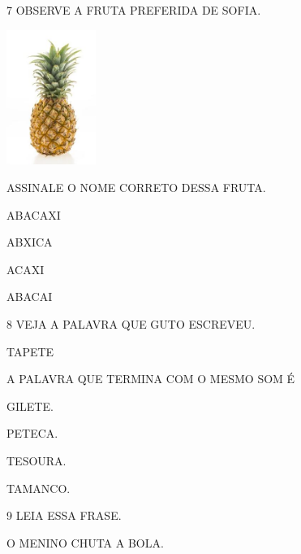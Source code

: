 \num{7} OBSERVE A FRUTA PREFERIDA DE SOFIA.

\includegraphics[width=1.15208in,height=1.72708in]{media/image192.jpg}


ASSINALE O NOME CORRETO DESSA FRUTA.

\begin{escolha}
\item ABACAXI

\item ABXICA

\item ACAXI

\item ABACAI
\end{escolha}

\num{8} VEJA A PALAVRA QUE GUTO ESCREVEU.

\begin{mdframed}[linewidth=2pt,linecolor=azul!20,backgroundcolor=azul!20,roundcorner=2pt]
TAPETE
\end{mdframed}

A PALAVRA QUE TERMINA COM O MESMO SOM É

\begin{escolha}
\item GILETE.

\item PETECA.

\item TESOURA.

\item TAMANCO.
\end{escolha}

\num{9} LEIA ESSA FRASE.

\begin{mdframed}[linewidth=2pt,linecolor=azul!20,backgroundcolor=azul!20,roundcorner=2pt]
O MENINO CHUTA A BOLA.
\end{mdframed}

